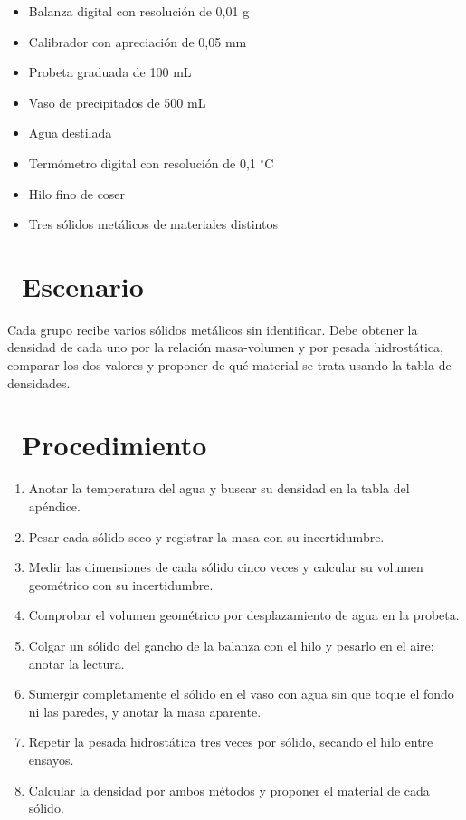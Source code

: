 \documentclass[11pt,a4paper]{article}
\newcommand{\iconotexto}[2]{\textcolor{cyanNeon}{\faIcon{#1}}~#2}
\begin{document}
\begin{itemize}[leftmargin=1.4em,itemsep=2pt,topsep=3pt]
  \item Balanza digital con resolución de 0,01 g
  \item Calibrador con apreciación de 0,05 mm
  \item Probeta graduada de 100 mL
  \item Vaso de precipitados de 500 mL
  \item Agua destilada
  \item Termómetro digital con resolución de 0,1 $^{\circ}$C
  \item Hilo fino de coser
  \item Tres sólidos metálicos de materiales distintos
\end{itemize}

\section{\iconotexto{flask}{Escenario}}

Cada grupo recibe varios sólidos metálicos sin identificar. Debe obtener la densidad de cada uno por la relación masa-volumen y por pesada hidrostática, comparar los dos valores y proponer de qué material se trata usando la tabla de densidades.

\section{\iconotexto{list-ol}{Procedimiento}}

\begin{enumerate}[leftmargin=1.4em,itemsep=2pt,topsep=3pt]
  \item Anotar la temperatura del agua y buscar su densidad en la tabla del apéndice.
  \item Pesar cada sólido seco y registrar la masa con su incertidumbre.
  \item Medir las dimensiones de cada sólido cinco veces y calcular su volumen geométrico con su incertidumbre.
  \item Comprobar el volumen geométrico por desplazamiento de agua en la probeta.
  \item Colgar un sólido del gancho de la balanza con el hilo y pesarlo en el aire; anotar la lectura.
  \item Sumergir completamente el sólido en el vaso con agua sin que toque el fondo ni las paredes, y anotar la masa aparente.
  \item Repetir la pesada hidrostática tres veces por sólido, secando el hilo entre ensayos.
  \item Calcular la densidad por ambos métodos y proponer el material de cada sólido.
\end{enumerate}
\end{document}
